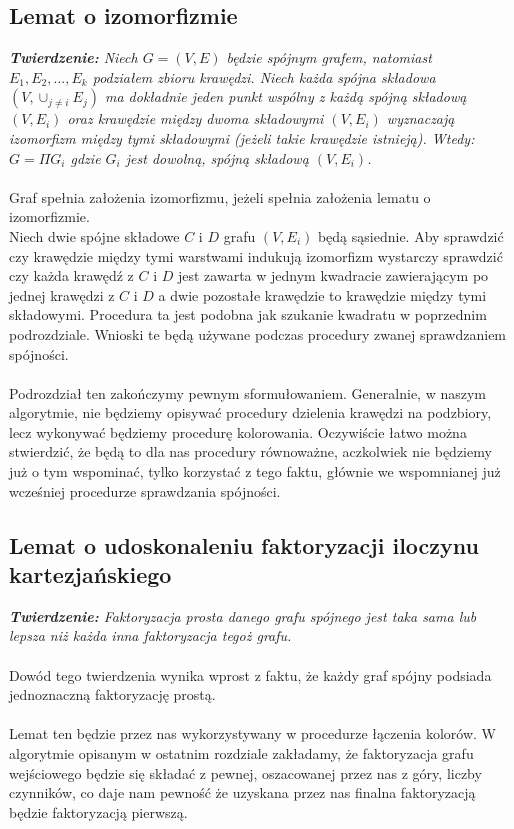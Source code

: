 \documentclass[12pt,a4paper,titlepage]{article}
\begin{document}
\subsection{Lemat o izomorfizmie}
\textit{\textbf{Twierdzenie: }Niech $G=(V, E)$ będzie spójnym grafem, natomiast $E_1 , E_2 , ... , E_k$ podziałem zbioru krawędzi. Niech każda spójna składowa $(V, \cup_{j \neq i}E_j)$ ma dokładnie jeden punkt wspólny z każdą spójną składową $(V, E_i)$ oraz krawędzie między dwoma składowymi $(V, E_i)$ wyznaczają izomorfizm między tymi składowymi (jeżeli takie krawędzie istnieją). Wtedy: $G=\Pi G_i $ gdzie $G_i $ jest dowolną, spójną składową $(V, E_i)$.}\\
\\
Graf spełnia założenia izomorfizmu, jeżeli spełnia założenia lematu o izomorfizmie. \\
Niech dwie spójne składowe $C$ i $D$ grafu $(V, E_i)$ będą sąsiednie. Aby sprawdzić czy krawędzie między tymi warstwami indukują izomorfizm wystarczy sprawdzić czy każda krawędź z $C$ i $D$ jest zawarta w jednym kwadracie zawierającym po jednej krawędzi z $C$ i $D$ a dwie pozostałe krawędzie to krawędzie między tymi składowymi. Procedura ta jest podobna jak szukanie kwadratu w poprzednim podrozdziale. Wnioski te będą używane podczas procedury zwanej sprawdzaniem spójności.\\
\\
Podrozdział ten zakończymy pewnym sformułowaniem. Generalnie, w naszym algorytmie, nie będziemy opisywać procedury dzielenia krawędzi na podzbiory, lecz wykonywać będziemy procedurę kolorowania. Oczywiście łatwo można stwierdzić, że będą to dla nas procedury równoważne, aczkolwiek nie będziemy już o tym wspominać, tylko korzystać z tego faktu, głównie we wspomnianej już wcześniej procedurze sprawdzania spójności.\\ 
\subsection{Lemat o udoskonaleniu faktoryzacji iloczynu kartezjańskiego}
\textit{\textbf{Twierdzenie:} Faktoryzacja prosta danego grafu spójnego jest taka sama lub lepsza niż każda inna faktoryzacja tegoż grafu.}\\
\\
Dowód tego twierdzenia wynika wprost z faktu, że każdy graf spójny podsiada jednoznaczną faktoryzację prostą. \\
\\
Lemat ten będzie przez nas wykorzystywany w procedurze łączenia kolorów. W algorytmie opisanym w ostatnim rozdziale zakładamy, że faktoryzacja grafu wejściowego będzie się składać z pewnej, oszacowanej przez nas z góry, liczby czynników, co daje nam pewność że uzyskana przez nas finalna faktoryzacją będzie faktoryzacją pierwszą.
\newpage
\end{document}

